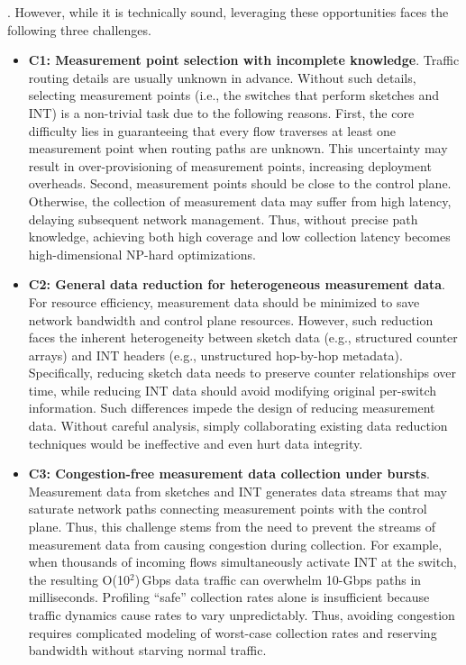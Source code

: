 .
However, while it is technically sound, leveraging these opportunities faces the following three challenges.

\begin{itemize}[leftmargin=*]
%
    \item \textbf{C1: Measurement point selection with incomplete knowledge}. Traffic routing details are usually unknown in advance. Without such details, selecting measurement points (i.e., the switches that perform sketches and INT) is a non-trivial task due to the following reasons. First, the core difficulty lies in guaranteeing that every flow traverses at least one measurement point when routing paths are unknown. This uncertainty may result in over-provisioning of measurement points, increasing deployment overheads. Second, measurement points should be close to the control plane. Otherwise, the collection of measurement data may suffer from high latency, delaying subsequent network management. Thus, without precise path knowledge, achieving both high coverage and low collection latency becomes high-dimensional NP-hard optimizations. 
%
    \item \textbf{C2: General data reduction for heterogeneous measurement data}. For resource efficiency, measurement data should be minimized to save network bandwidth and control plane resources. However, such reduction faces the inherent heterogeneity between sketch data (e.g., structured counter arrays) and INT headers (e.g., unstructured hop-by-hop metadata). Specifically, reducing sketch data needs to preserve counter relationships over time, while reducing INT data should avoid modifying original per-switch information. Such differences impede the design of reducing measurement data. Without careful analysis, simply collaborating existing data reduction techniques would be ineffective and even hurt data integrity. 
%
    \item \textbf{C3: Congestion-free measurement data collection under bursts}. Measurement data from sketches and INT generates data streams that may saturate network paths connecting measurement points with the control plane. Thus, this challenge stems from the need to prevent the streams of measurement data from causing congestion during collection. For example, when thousands of incoming flows simultaneously activate INT at the switch, the resulting O(10$^2$)\,Gbps data traffic can overwhelm 10-Gbps paths in milliseconds. Profiling ``safe'' collection rates alone is insufficient because traffic dynamics cause rates to vary unpredictably. Thus, avoiding congestion requires complicated modeling of worst-case collection rates and reserving bandwidth without starving normal traffic.
%
\end{itemize}

